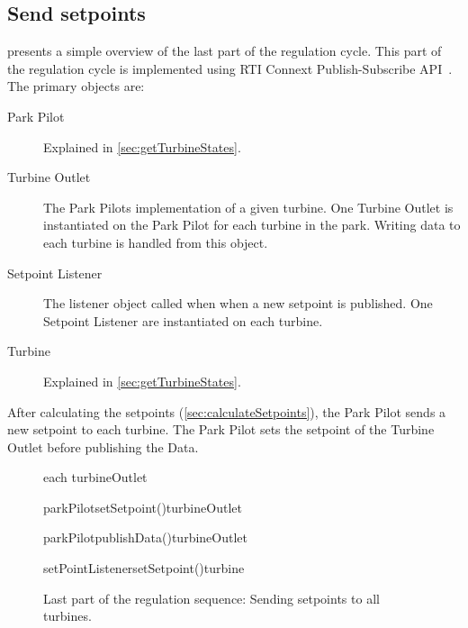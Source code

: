 \subsection{Send setpoints}

 presents a simple overview of the last part of the regulation cycle. This part of the regulation cycle is implemented using RTI Connext Publish-Subscribe API~\cite{rtiConnextUsersManual}. The primary objects are:

\begin{description}
	\item [Park Pilot] Explained in \cref{sec:getTurbineStates}.
	\item [Turbine Outlet] The Park Pilots implementation of a given turbine. One Turbine Outlet is instantiated on the Park Pilot for each turbine in the park. Writing data to each turbine is handled from this object.
	\item [Setpoint Listener] The listener object called when when a new setpoint is published. One Setpoint Listener are instantiated on each turbine.
	\item [Turbine] Explained in \cref{sec:getTurbineStates}.
\end{description}

After calculating the setpoints (\cref{sec:calculateSetpoints}), the Park Pilot sends a new setpoint to each turbine. The Park Pilot sets the setpoint of the Turbine Outlet before publishing the Data.

\begin{figure}[!h]
	\centering
	\begin{sequencediagram} %
	
		\begin{sdblock}{each turbineOutlet}{}
			\begin {call}{parkPilot}{setSetpoint()}{turbineOutlet}{}
			\end {call}
			\begin {call}{parkPilot}{publishData()}{turbineOutlet}{}
				\begin {call}{setPointListener}{setSetpoint()}{turbine}{}
				\end {call}
			\end {call}
		\end{sdblock}				
	\end{sequencediagram}

	\caption[Last part of the regulation cycle]{
		\label{fig:sendSetpoints} 
		\footnotesize{%
			Last part of the regulation sequence: Sending setpoints to all turbines.
		}
	}
\end{figure}

